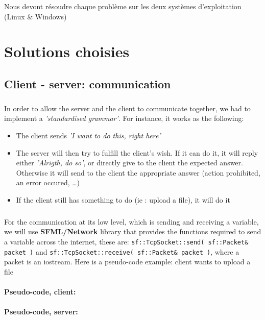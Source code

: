 \documentclass[12pt,a4paper,twoside]{article}
\begin{document}
			Nous devont résoudre chaque problème sur les deux systèmes d'exploitation (Linux \& Windows)
	\section{Solutions choisies} %
		\subsection{Client - server: communication} %
			\subparagraph*{}
				In order to allow the server and the client to communicate together, we had to implement a \textit{'standardised grammar'}. For instance, it works as the following:
				\begin{itemize}
					\item{} The client sends \textit{'I want to do this, right here'}
					\item{} The server will then try to fulfill the client's wish. If it can do it, it will reply either \textit{'Alrigth, do so'}, or directly give to the client the expected answer. Otherwise it will send to the client the appropriate answer (action prohibited, an error occured, \ldots{})
					\item{} If the client still has something to do (ie : upload a file), it will do it
				\end{itemize}
			\subparagraph*{}
				For the communication at its low level, which is sending and receiving a variable, we will use \textbf{SFML/Network} library that provides the functions required to send a variable across the internet, these are: \lstinline$sf::TcpSocket::send( sf::Packet& packet )$ and \lstinline$sf::TcpSocket::receive( sf::Packet& packet )$, where a packet is an iostream.
				Here is a pseudo-code example: client wants to upload a file
			\paragraph*{Pseudo-code, client:}
				
			\paragraph*{Pseudo-code, server:}
				
				
\end{document}
